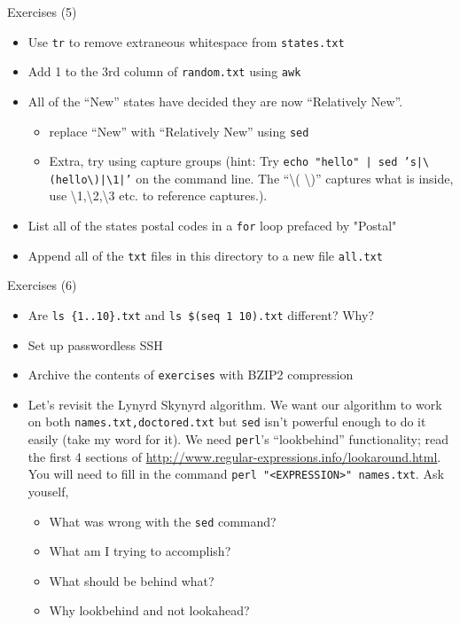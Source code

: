 \documentclass[hyperref={pdfpagelabels=false},12pt]{beamer}
\begin{document}
\begin{frame}[label=exercises-5]{Exercises (5)}
\begin{itemize}
    \item Use \texttt{tr} to remove extraneous whitespace from \texttt{states.txt}
    \item Add 1 to the 3rd column of \texttt{random.txt} using \texttt{awk}
    \item All of the ``New'' states have decided they are now ``Relatively New''.
    \begin{itemize}
        \item replace ``New'' with ``Relatively New'' using \texttt{sed} 
        \item Extra, try using capture groups (hint: Try \texttt{echo "hello" |
        sed 's|\textbackslash(hello\textbackslash)|\textbackslash1|'} on the
        command line. The ``\textbackslash( \textbackslash)'' captures what is
        inside, use \textbackslash1,\textbackslash2,\textbackslash3 etc. to
        reference captures.).
    \end{itemize}
    \item List all of the states postal codes in a \texttt{for} loop prefaced by "Postal"
    \item Append all of the \texttt{txt} files in this directory to a new file \texttt{all.txt}
\end{itemize}
\end{frame}

\begin{frame}[label=exercises-6]{Exercises (6)}
\begin{itemize}
    \item Are \texttt{ls \{1..10\}.txt} and \texttt{ls \$(seq 1 10).txt} different? Why?
    \item Set up passwordless SSH
    \item Archive the contents of \texttt{exercises} with BZIP2 compression
    \item Let's revisit the Lynyrd Skynyrd algorithm. We want our algorithm to
    work on both \texttt{names.txt,doctored.txt} but \texttt{sed} isn't
    powerful enough to do it easily (take my word for it). We need
    \texttt{perl}'s ``lookbehind'' functionality; read the first 4 sections of
    \url{http://www.regular-expressions.info/lookaround.html}. You will need to
    fill in the command \texttt{perl "<EXPRESSION>" names.txt}. Ask youself,
    \begin{itemize}
        \item What was wrong with the \texttt{sed} command?
        \item What am I trying to accomplish?
        \item What should be behind what?
        \item Why lookbehind and not lookahead?
    \end{itemize}
\end{itemize}
\end{frame}
\end{document}

